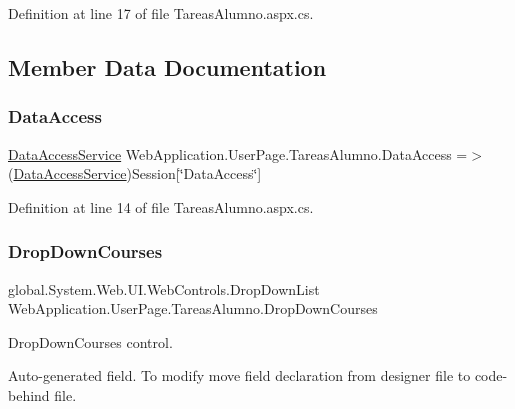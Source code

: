 Definition at line 17 of file Tareas\+Alumno.\+aspx.\+cs.



\subsection{Member Data Documentation}
\mbox{\label{classWebApplication_1_1UserPage_1_1TareasAlumno_a63b4d6c345c2df409f3119583bf39039}} 
\subsubsection{\texorpdfstring{DataAccess}{DataAccess}}
{\footnotesize\ttfamily \mbox{\hyperlink{classDataBaseAccess_1_1DataAccessService}{Data\+Access\+Service}} Web\+Application.\+User\+Page.\+Tareas\+Alumno.\+Data\+Access =$>$ (\mbox{\hyperlink{classDataBaseAccess_1_1DataAccessService}{Data\+Access\+Service}})Session\mbox{[}\char`\"{}Data\+Access\char`\"{}\mbox{]}\hspace{0.3cm}{\ttfamily [private]}}



Definition at line 14 of file Tareas\+Alumno.\+aspx.\+cs.

\mbox{\label{classWebApplication_1_1UserPage_1_1TareasAlumno_a7fbd883512b50dbc46ea6e9cfc081c75}} 
\subsubsection{\texorpdfstring{DropDownCourses}{DropDownCourses}}
{\footnotesize\ttfamily global.\+System.\+Web.\+U\+I.\+Web\+Controls.\+Drop\+Down\+List Web\+Application.\+User\+Page.\+Tareas\+Alumno.\+Drop\+Down\+Courses\hspace{0.3cm}{\ttfamily [protected]}}



Drop\+Down\+Courses control. 

Auto-\/generated field. To modify move field declaration from designer file to code-\/behind file. 

